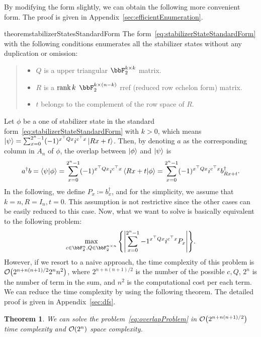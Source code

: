 \documentclass[a4paper, onecolumn, 11pt, longbibliography]{quantumarticle}
\newcommand{\defeq}{\coloneqq}
\newtheorem{theorem}{Theorem}
\begin{document}
By modifying the form slightly,
we can obtain the following more convenient form.
The proof is given in Appendix~\ref{sec:efficientEnumeration}.
\begin{restatable}{theorem}{stabilizerStatesStandardForm}
  The form~\eqref{eq:stabilizerStateStandardForm}
  with the following conditions enumerates all the stabilizer states
  without any duplication or omission:
  \begin{quote}
    \begin{itemize}
      \item $Q$ is a upper triangular $\bbF_2^{k \times k}$ matrix.
      \item $R$ is a $\rank{k}$ $\bbF_2^{k \times (n-k)}$ rref (reduced row echelon form) matrix.
      \item $t$ belongs to the complement of the row space of $R$.
    \end{itemize}
  \end{quote}
\end{restatable}

Let $\phi$ be a one of stabilizer state
in the standard form~\eqref{eq:stabilizerStateStandardForm}
with $k>0$, which means
$\ket{\psi} = \sum_{x=0}^{2^n-1} (-1)^{x^\top Q x} i^{c^\top x} \ket{Rx+t}$.
Then, by denoting $a$ as the corresponding column in $A_n$ of $\phi$,
the overlap between $\ket{\phi}$ and $\ket{\psi}$ is
\begin{equation*}
  a^\dagger b
  = \braket{\psi}{\phi}
  = \sum_{x=0}^{2^n-1} (-1)^{x^\top Q x} i^{c^\top x} \braket{Rx+t}{\phi}
  = \sum_{x=0}^{2^n-1} (-1)^{x^\top Q x} i^{c^\top x} b_{Rx+t}^\dagger.
\end{equation*}
In the following, we define $P_x \defeq b_x^\dagger$,
and for the simplicity, we assume that $k=n,R=I_n,t=0$.
This assumption is not restrictive since
the other cases can be easily reduced to this case.
Now, what we want to solve is basically
equivalent to the following problem:
\begin{equation*}\label{eq:overlapProblem}
  \max_{c\in \bbF_2^{n},Q\in \bbF_2^{n \times n}} \qty{ \abs{\sum_{x=0}^{2^n-1} -1^{x^\top Q x} i^{c^\top x} P_x} }.
\end{equation*}
However, if we resort to a naive approach,
the time complexity of this problem is $\order{2^{n+n(n+1)/2} 2^n n^2}$,
where $2^{n+n(n+1)/2}$ is the number of the possible $c,Q$,
$2^n$ is the number of term in the sum,
and $n^2$ is the computational cost per each term.
We can reduce the time complexity by using the following theorem.
The detailed proof is given in Appendix~\ref{sec:dfs}.
\begin{theorem}
  We can solve the problem~\eqref{eq:overlapProblem}
  in $\order{2^{n+n(n+1)/2}}$ time complexity and $\order{2^n}$ space complexity.
\end{theorem}
\end{document}
